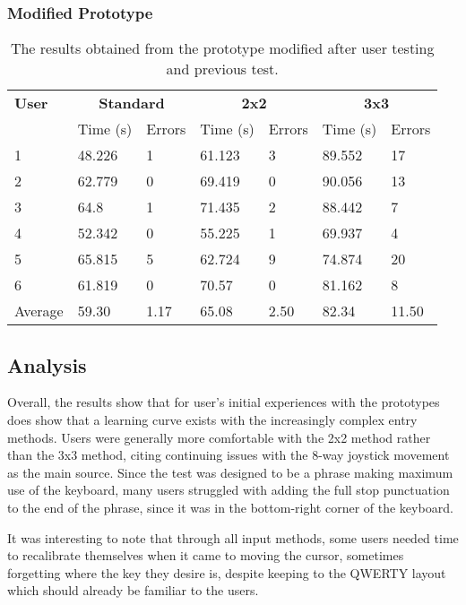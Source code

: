 \documentclass[evaluation.tex]{subfiles}
\begin{document}
\subsubsection{Modified Prototype} %
\label{ssub:modified_prototype}
\begin{table}[H]
	\centering
	\begin{tabular}{| l | l | l | l | l | l | l |}
	 \hline
	 \textbf{User} & \multicolumn{2}{c|}{\textbf{Standard}} &
	 \multicolumn{2}{c|}{\textbf{2x2}} & \multicolumn{2}{c|}{\textbf{3x3}} \\
	 \cline{2-3} \cline{4-5} \cline{6-7}
	 & Time (s) & Errors & Time (s) & Errors & Time (s) & Errors \\
	 \hline
	 1 & 48.226 & 1 & 61.123 & 3 & 89.552 & 17 \\
	 2 & 62.779 & 0 & 69.419 & 0 & 90.056 & 13 \\
	 3 & 64.8 & 1 & 71.435 & 2 & 88.442 & 7 \\
	 4 & 52.342 & 0 & 55.225 & 1 & 69.937 & 4 \\
	 5 & 65.815 & 5 & 62.724 & 9 & 74.874 & 20 \\
	 6 & 61.819 & 0 & 70.57 & 0 & 81.162 & 8 \\
	 \hline
	 Average & 59.30 & 1.17 & 65.08 & 2.50 & 82.34 & 11.50 \\
	 \hline
	\end{tabular}
	\caption{The results obtained from the prototype modified after user
	testing and previous test.}
\end{table}

\subsection{Analysis} %
\label{sub:analysis}
Overall, the results show that for user's initial experiences with the
prototypes does show that a learning curve exists with the increasingly complex
entry methods.  Users were generally more comfortable with the 2x2 method rather
than the 3x3 method, citing continuing issues with the 8-way joystick movement
as the main source. Since the test was designed to be a phrase making maximum
use of the keyboard, many users struggled with adding the full stop punctuation
to the end of the phrase, since it was in the bottom-right corner of the
keyboard. 

It was interesting to note that through all input methods, some users needed
time to recalibrate themselves when it came to moving the cursor, sometimes
forgetting where the key they desire is, despite keeping to the QWERTY layout
which should already be familiar to the users.
\end{document}
